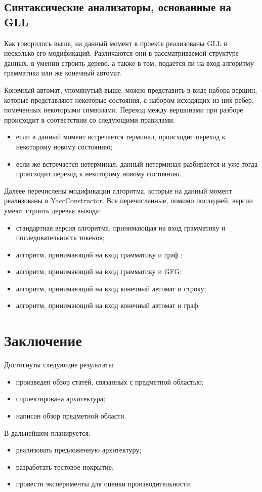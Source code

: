 \documentclass[14pt]{matmex-diploma}
\begin{document}
\subsection{Синтаксические анализаторы, основанные на GLL}
Как говорилось выше, на данный момент в проекте реализованы GLL и несколько его модификаций. Различаются они в рассматриваемой структуре данных, в умении строить дерево, а также в том, подается ли на вход алгоритму грамматика или же конечный автомат. %

Конечный автомат, упомянутый выше, можно представить в виде набора вершин, которые представляют некоторые состояния, с набором исходящих из них ребер, помеченных некоторыми символами. Переход между вершинами при разборе происходит в соответствии со следующими правилами: 
\begin{itemize}
    \item если в данный момент встречается терминал, происходит переход к некоторому новому состоянию;
    \item если же встречается нетерминал, данный нетерминал разбирается и уже тогда происходит переход к некоторому новому состоянию.
\end{itemize}

Далеее перечислены модификации алгоритма, которые на данный момент реализованы в YaccConstructor. Все перечисленные, помимо последней, версии умеют строить деревья вывода:
\begin{itemize}
    \item стандартная версия алгоритма, принимающая на вход грамматику и последовательность токенов;
    \item алгоритм, принимающий на вход грамматику и граф ;
    \item алгоритм, принимающий на вход грамматику и GFG\cite{GFGDesc};
    \item алгоритм, принимающий на вход конечный автомат и строку;
    \item алгоритм, принимающий на вход конечный автомат и граф.
\end{itemize}

\section{Заключение}
Достигнуты следующие результаты:
\begin{itemize}
    \item произведен обзор статей, связанных с предметной областью;
    \item спроектирована архитектура;
    \item написан обзор предметной области.
\end{itemize}
В дальнейшем планируется:
\begin{itemize}
    \item реализовать предложенную архитектуру;
    \item разработать тестовое покрытие;
    \item провести эксперименты для оценки производительности.
\end{itemize}


\setmonofont[Mapping=tex-text]{CMU Typewriter Text}


\end{document}
